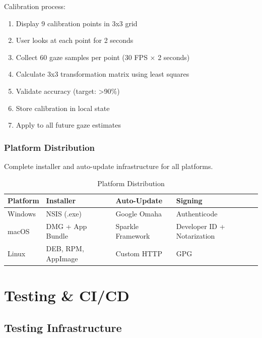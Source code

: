 \documentclass[11pt,letterpaper]{article}
\begin{document}
Calibration process:

\begin{enumerate}
    \item Display 9 calibration points in 3x3 grid
    \item User looks at each point for 2 seconds
    \item Collect 60 gaze samples per point (30 FPS × 2 seconds)
    \item Calculate 3x3 transformation matrix using least squares
    \item Validate accuracy (target: >90\%)
    \item Store calibration in local state
    \item Apply to all future gaze estimates
\end{enumerate}

\subsubsection{Platform Distribution}

Complete installer and auto-update infrastructure for all platforms.

\begin{table}[H]
\centering
\begin{tabularx}{\textwidth}{lXXl}
\toprule
\textbf{Platform} & \textbf{Installer} & \textbf{Auto-Update} & \textbf{Signing} \\
\midrule
Windows & NSIS (.exe) & Google Omaha & Authenticode \\
macOS & DMG + App Bundle & Sparkle Framework & Developer ID + Notarization \\
Linux & DEB, RPM, AppImage & Custom HTTP & GPG \\
\bottomrule
\end{tabularx}
\caption{Platform Distribution}
\end{table}


\section{Testing \& CI/CD}

\subsection{Testing Infrastructure}
\end{document}
